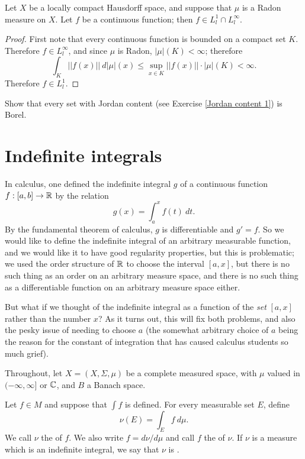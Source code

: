 \begin{lemma}
Let $X$ be a locally compact Hausdorff space, and suppose that $\mu$ is a Radon measure on $X$.
Let $f$ be a continuous function; then $f \in L^1_{l} \cap L^\infty_l$.
\end{lemma}
\begin{proof}
First note that every continuous function is bounded on a compact set $K$.
Therefore $f \in L^\infty_l$, and since $\mu$ is Radon, $|\mu|(K) < \infty$; therefore
\[\int_{K} ||f(x)||~d|\mu|(x) \leq \sup_{x \in K} ||f(x)||\cdot |\mu|(K) < \infty.\]
Therefore $f \in L^1_l$.
\end{proof}

\begin{exercise}
Show that every set with Jordan content (see Exercise \ref{Jordan content 1}) is Borel.
\end{exercise}

\section{Indefinite integrals}
In calculus, one defined the indefinite integral $g$ of a continuous function $f: [a, b] \to \mathbb{R}$ by the relation
\[g(x) = \int_{a}^{x} f(t)~dt.\]
By the fundamental theorem of calculus, $g$ is differentiable and $g' = f$.
So we would like to define the indefinite integral of an arbitrary measurable function, and we would like it to have good regularity properties, but this is problematic; we used the order structure of $\mathbb{R}$ to choose the interval $[a, x]$, but there is no such thing as an order on an arbitrary measure space, and there is no such thing as a differentiable function on an arbitrary measure space either.

But what if we thought of the indefinite integral as a function of the \emph{set} $[a, x]$ rather than the number $x$?
As it turns out, this will fix both problems, and also the pesky issue of needing to choose $a$ (the somewhat arbitrary choice of $a$ being the reason for the constant of integration that has caused calculus students so much grief).

\begin{subsec}
Throughout, let $X = (X, \Sigma, \mu)$ be a complete measured space, with $\mu$ valued in $(-\infty, \infty]$ or $\mathbb{C}$, and $B$ a Banach space.
\end{subsec}

\begin{definition}
Let $f \in M$ and suppose that $\int f$ is defined. For every measurable set $E$, define
\[\nu(E) = \int_{E} f~d\mu.\]
We call $\nu$ the  of $f$.
We also write $f = d\nu/d\mu$ and call $f$ the  of $\nu$.
If $\nu$ is a measure which is an indefinite integral, we say that $\nu$ is .
\end{definition}

